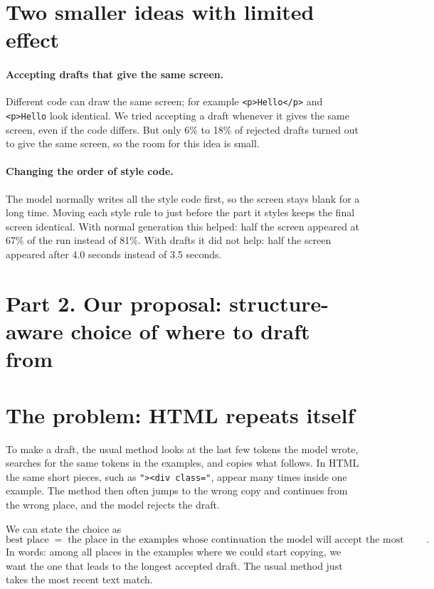 \documentclass[10pt,a4paper]{article}
\begin{document}
\section{Two smaller ideas with limited effect}
\paragraph{Accepting drafts that give the same screen.} Different code can draw the same screen; for example \texttt{<p>Hello</p>} and \texttt{<p>Hello} look identical. We tried accepting a draft whenever it gives the same screen, even if the code differs. But only 6\% to 18\% of rejected drafts turned out to give the same screen, so the room for this idea is small.

\paragraph{Changing the order of style code.} The model normally writes all the style code first, so the screen stays blank for a long time. Moving each style rule to just before the part it styles keeps the final screen identical. With normal generation this helped: half the screen appeared at 67\% of the run instead of 81\%. With drafts it did not help: half the screen appeared after 4.0 seconds instead of 3.5 seconds.

\section*{Part 2. Our proposal: structure-aware choice of where to draft from}

\section{The problem: HTML repeats itself}
To make a draft, the usual method looks at the last few tokens the model wrote, searches for the same tokens in the examples, and copies what follows. In HTML the same short pieces, such as \texttt{"><div class="}, appear many times inside one example. The method then often jumps to the wrong copy and continues from the wrong place, and the model rejects the draft.

We can state the choice as
\begin{equation}
\text{best place} \;=\; \text{the place in the examples whose continuation the model will accept the most tokens of}.
\end{equation}
In words: among all places in the examples where we could start copying, we want the one that leads to the longest accepted draft. The usual method just takes the most recent text match.
\end{document}
